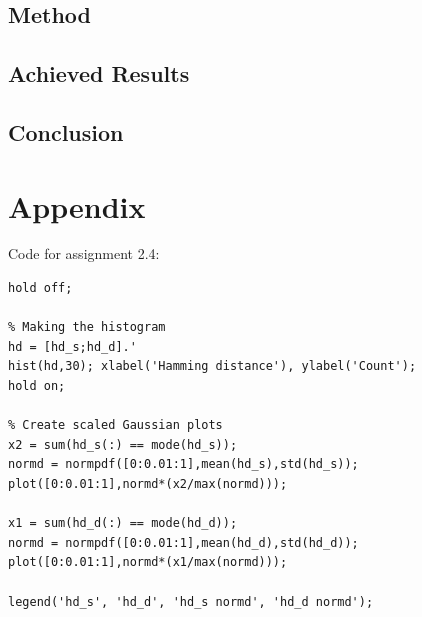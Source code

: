 \documentclass{article}
\begin{document}
\subsection{Method}
\subsection{Achieved Results}
\subsection{Conclusion}




\section*{Appendix}
Code for assignment 2.4:
\begin{lstlisting}
hold off;

% Making the histogram
hd = [hd_s;hd_d].'
hist(hd,30); xlabel('Hamming distance'), ylabel('Count');
hold on;

% Create scaled Gaussian plots
x2 = sum(hd_s(:) == mode(hd_s));
normd = normpdf([0:0.01:1],mean(hd_s),std(hd_s));
plot([0:0.01:1],normd*(x2/max(normd)));

x1 = sum(hd_d(:) == mode(hd_d));
normd = normpdf([0:0.01:1],mean(hd_d),std(hd_d));
plot([0:0.01:1],normd*(x1/max(normd)));

legend('hd_s', 'hd_d', 'hd_s normd', 'hd_d normd');
\end{lstlisting}
\end{document}
